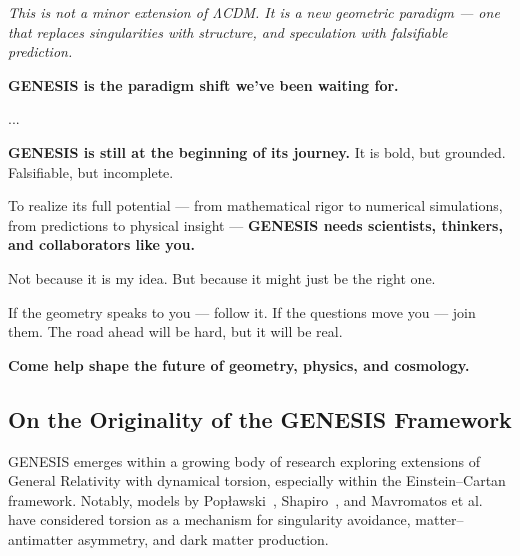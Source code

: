 \documentclass{article}
\begin{document}
\vspace{1em}

\begin{tcolorbox}[colback=white, colframe=green!50!black, title=Conclusion]
\emph{This is not a minor extension of ΛCDM.  
It is a new geometric paradigm — one that replaces singularities with structure,  
and speculation with falsifiable prediction.}

\centering
\textbf{GENESIS is the paradigm shift we've been waiting for.}
\end{tcolorbox}



...

\begin{tcolorbox}[colback=white, colframe=green!50!black, coltitle=white, 
  title=Open Invitation, 
  boxrule=1.2pt, arc=2mm, top=4pt, bottom=4pt, left=6pt, right=6pt]

\textbf{GENESIS is still at the beginning of its journey.}  
It is bold, but grounded. Falsifiable, but incomplete.

To realize its full potential — from mathematical rigor to numerical simulations, from predictions to physical insight —  
\textbf{GENESIS needs scientists, thinkers, and collaborators like you.}

Not because it is my idea.  
But because it might just be the right one.

If the geometry speaks to you — follow it.  
If the questions move you — join them.  
The road ahead will be hard, but it will be real.

\vspace{0.5em}
\centering
\textbf{Come help shape the future of geometry, physics, and cosmology.}

\end{tcolorbox}

\subsection{ On the Originality of the GENESIS Framework}

GENESIS emerges within a growing body of research exploring extensions of General Relativity with dynamical torsion, especially within the Einstein–Cartan framework. Notably, models by Popławski~\cite{Poplawski2011,Poplawski2012}, Shapiro~\cite{shapiro2002}, and Mavromatos et al.~\cite{Mavromatos2023} have considered torsion as a mechanism for singularity avoidance, matter–antimatter asymmetry, and dark matter production.
\end{document}
